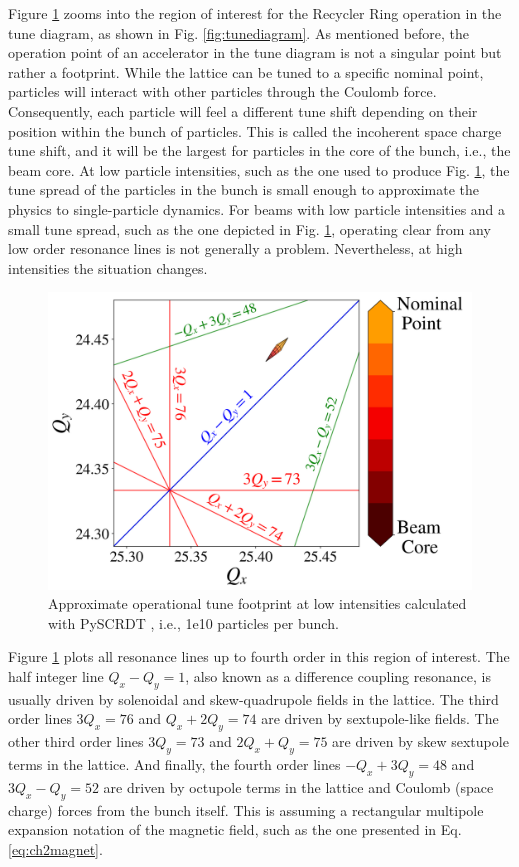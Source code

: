 Figure \ref{fig:rrtdlow} zooms into the region of interest for the Recycler Ring operation in the tune diagram, as shown in Fig. \ref{fig:tunediagram}. As mentioned before, the operation point of an accelerator in the tune diagram is not a singular point but rather a footprint. While the lattice can be tuned to a specific nominal point, particles will interact with other particles through the Coulomb force. Consequently, each particle will feel a different tune shift depending on their position within the bunch of particles. This is called the incoherent space charge tune shift, and it will be the largest for particles in the core of the bunch, i.e., the beam core. At low particle intensities, such as the one used to produce Fig. \ref{fig:rrtdlow}, the tune spread of the particles in the bunch is small enough to approximate the physics to single-particle dynamics. For beams with low particle intensities and a small tune spread, such as the one depicted in Fig. \ref{fig:rrtdlow}, operating clear from any low order resonance lines is not generally a problem. Nevertheless, at high intensities the situation changes.   

 \begin{figure}[H]
    \centering
    \includegraphics[width=\columnwidth]{chapter2/rrtdlow.png}
    \caption{Approximate operational tune footprint at low intensities calculated with PySCRDT \cite{pyscrdt}, i.e., 1e10 particles per bunch.}
    \label{fig:rrtdlow}
 \end{figure}

Figure \ref{fig:rrtdlow} plots all resonance lines up to fourth order in this region of interest. The half integer line $Q_x-Q_y=1$, also known as a difference coupling resonance, is usually driven by solenoidal and skew-quadrupole fields in the lattice. The third order lines $3Q_x=76$ and $Q_x+2Q_y=74$ are driven by sextupole-like fields. The other third order lines $3Q_y=73$ and $2Q_x+Q_y=75$ are driven by skew sextupole terms in the lattice. And finally, the fourth order lines $-Q_x+3Q_y=48$ and $3Q_x-Q_y=52$ are driven by octupole terms in the lattice and Coulomb (space charge) forces from the bunch itself. This is assuming a rectangular multipole expansion notation of the magnetic field, such as the one presented in Eq. \ref{eq:ch2magnet}.      

